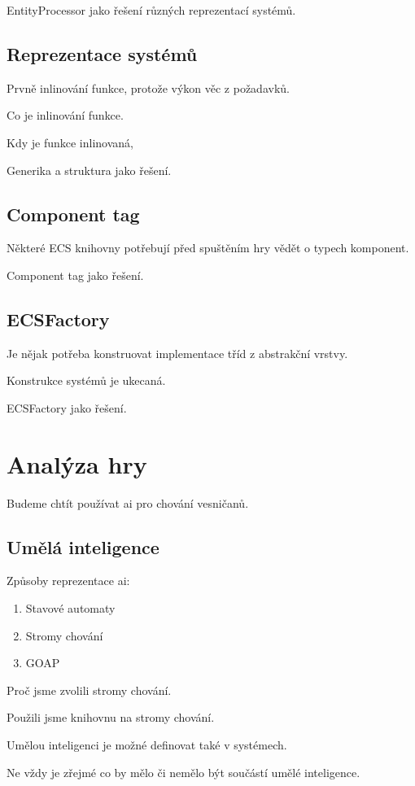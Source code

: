 EntityProcessor jako řešení různých reprezentací systémů.

\subsection{Reprezentace systémů}
Prvně inlinování funkce, protože výkon věc z požadavků.

Co je inlinování funkce.

Kdy je funkce inlinovaná,

Generika a struktura jako řešení.

\subsection{Component tag}
Některé ECS knihovny potřebují před spuštěním hry vědět o typech komponent.

Component tag jako řešení.

\subsection{ECSFactory}
Je nějak potřeba konstruovat implementace tříd z abstrakční vrstvy.

Konstrukce systémů je ukecaná.

ECSFactory jako řešení.

\section{Analýza hry}
Budeme chtít používat ai pro chování vesničanů.

\subsection{Umělá inteligence}
Způsoby reprezentace ai:

\begin{enumerate}
    \item Stavové automaty
    \item Stromy chování
    \item GOAP
\end{enumerate}

Proč jsme zvolili stromy chování.

Použili jsme knihovnu na stromy chování.

Umělou inteligenci je možné definovat také v systémech.

Ne vždy je zřejmé co by mělo či nemělo být součástí umělé inteligence.

